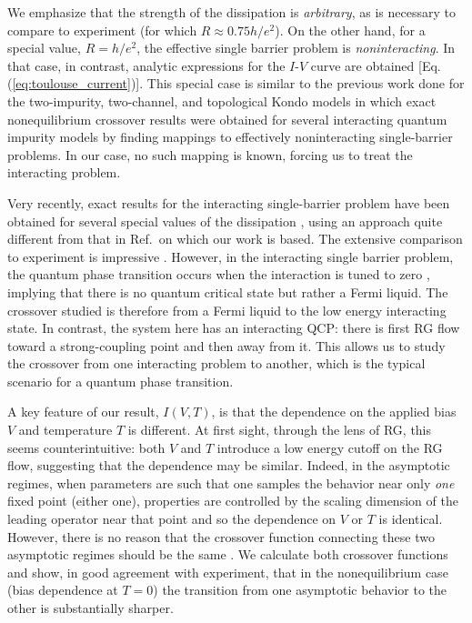 \documentclass[aps,prb,reprint,floatfix,superscriptaddress,amssymb,amsmath]{revtex4-2}
\begin{document}
We emphasize that the strength of the dissipation is \emph{arbitrary}, as is necessary to compare to experiment (for which $R \!\approx\! 0.75 h/e^2 $). On the other hand, for a special value, $R\!=\!h/e^2 $, the effective single barrier problem is \textit{noninteracting}. In that case, in contrast, analytic expressions for the $I$-$V$ curve are obtained [Eq.\,(\ref{eq:toulouse_current})].
This special case is similar to the previous work done for the two-impurity, two-channel, and topological Kondo models \cite{SelaExactTransPRL09,*SelaNoneqQdotsPRB09, MitchellSelaPRL16, BeriPRL17} in which exact nonequilibrium crossover results were obtained for several interacting quantum impurity models by finding mappings to effectively noninteracting single-barrier problems. In our case, no such mapping is known, forcing us to treat the interacting problem. 

Very recently, exact results for the interacting single-barrier problem have been obtained for several special values of the dissipation \cite{boulatX2019}, using an approach quite different from that in Ref.\,\cite{FendleyPRB95} on which our work is based. The extensive comparison to experiment is impressive \cite{AnthorePierrePRX18}. 
However, in the interacting single barrier problem, the quantum phase transition occurs when the interaction is tuned to zero \cite{KaneFisherPRB92}, implying that there is no quantum critical state but rather a Fermi liquid. The crossover studied \cite{AnthorePierrePRX18} is therefore from a Fermi liquid to the low energy interacting state.  
In contrast, the system here has an interacting QCP: there is first RG flow toward a strong-coupling point and then away from it. This allows us to study the crossover from one interacting problem to another, which is the typical scenario for a quantum phase transition. 

A key feature of our result, $I(V,T)$, is that the dependence on the applied bias $V$ and temperature $T$ is different. At first sight, through the lens of RG, this seems counterintuitive: both $V$ and $T$ introduce a low energy cutoff on the RG flow, suggesting that the dependence may be similar. Indeed, in the asymptotic regimes, when parameters are such that one samples the behavior near only \emph{one} fixed point (either one), properties are controlled by the scaling dimension of the leading operator near that point and so the dependence on $V$ or $T$ is identical. 
However, there is no reason that the crossover function connecting these two asymptotic regimes should be the same \cite{KaneFisherPRB92, AristovWoelfle09, AnthorePierrePRX18}. We calculate both crossover functions and show, in good agreement with experiment, that in the nonequilibrium case (bias dependence at $T\!=\!0$) the transition from one asymptotic behavior to the other is substantially sharper. 
\end{document}
